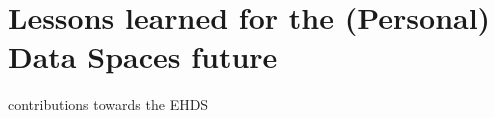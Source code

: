 \section{Lessons learned for the (Personal) Data Spaces future}
\label{sec:dgaterms}

contributions towards the EHDS